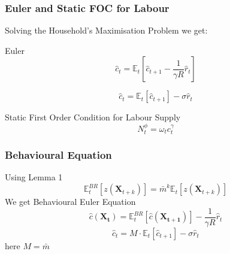 \documentclass{beamer}
\begin{document}
\subsubsection{Euler and Static FOC for Labour}
\begin{frame}{\subsecname}
Solving the Household's Maximisation Problem we get:

Euler
\begin{equation}\tag{18}
    \hat{c}_{t}=\mathbb{E}_{t}\left[\hat{c}_{t+1}-\frac{1}{\gamma R}\hat{r}_{t}\right]
\end{equation}

\begin{equation*}
    \hat{c}_{t}=\mathbb{E}_{t}\left[\hat{c}_{t+1}\right]-\sigma\hat{r}_{t}
\end{equation*}

Static First Order Condition for Labour Supply
\begin{equation}\tag{20}
    N^{\phi}_{t}=\omega_{t}c_{t}^{\gamma}
\end{equation}

\end{frame}

\subsubsection{Behavioural Equation}
\begin{frame}{\subsecname}

Using Lemma 1
\begin{equation*}
    \mathbb{E}_{t}^{BR}\left[z\left(\bm{X}_{t+k}\right)\right]=\bar{m}^{k}\mathbb{E}_{t}\left[z\left(\bm{X}_{t+k}\right)\right]
\end{equation*}
We get Behavioural Euler Equation
\begin{equation*}
    \hat{c}(\bm{X_{t}})=\mathbb{E}_{t}^{BR}\left[\hat{c}(\bm{X_{t+1}})\right]-\frac{1}{\gamma R}\hat{r}_{t}
\end{equation*}
\begin{equation}\tag{19}
    \hat{c}_{t}=M\cdot\mathbb{E}_{t}\left[\hat{c}_{t+1}\right]-\sigma\hat{r}_{t}
\end{equation} 
here $M=\bar{m}$
\end{frame}
\end{document}
